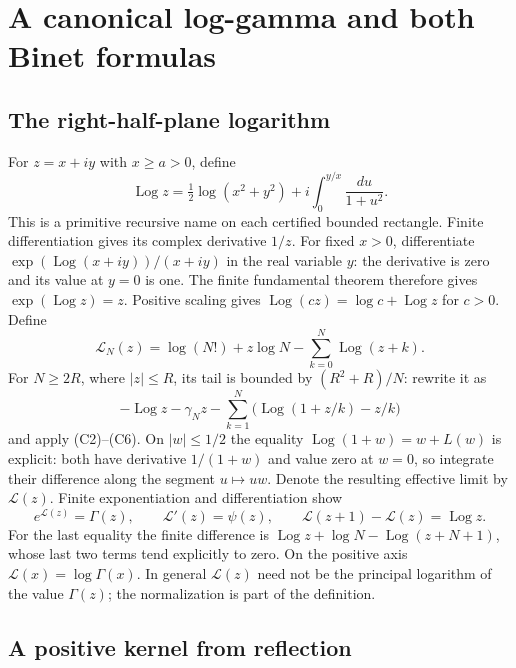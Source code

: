 \section{A canonical log-gamma and both Binet formulas}
\label{sec:binet}

\subsection{The right-half-plane logarithm}

For $z=x+iy$ with $x\ge a>0$, define
\[
 \operatorname{Log}z
 =\tfrac12\log(x^2+y^2)
    +i\int_0^{y/x}\frac{du}{1+u^2}.
\]
This is a primitive recursive name on each certified bounded rectangle.
Finite differentiation gives its complex derivative $1/z$.
For fixed $x>0$, differentiate
$\exp(\operatorname{Log}(x+iy))/(x+iy)$ in the real variable $y$:
the derivative is zero and its value at $y=0$ is one. The finite
fundamental theorem therefore gives $\exp(\operatorname{Log}z)=z$.
Positive scaling gives
$\operatorname{Log}(cz)=\log c+\operatorname{Log}z$ for $c>0$.
Define
\[
 \mathcal L_N(z)=\log(N!)+z\log N-
                        \sum_{k=0}^N\operatorname{Log}(z+k).
\]
For $N\ge2R$, where $|z|\le R$, its tail is bounded by
$(R^2+R)/N$: rewrite it as
\[
 -\operatorname{Log}z-\gamma_Nz
 -\sum_{k=1}^N\bigl(\operatorname{Log}(1+z/k)-z/k\bigr)
\]
and apply (C2)--(C6). On $|w|\le1/2$ the equality
$\operatorname{Log}(1+w)=w+L(w)$ is explicit: both have derivative
$1/(1+w)$ and value zero at $w=0$, so integrate their difference
along the segment $u\mapsto uw$. Denote the resulting effective limit by
$\mathcal L(z)$. Finite exponentiation and differentiation show
\begin{equation}
 e^{\mathcal L(z)}=\Gamma(z),\qquad
 \mathcal L'(z)=\psi(z),\qquad
 \mathcal L(z+1)-\mathcal L(z)=\operatorname{Log}z.
 \label{eq:canonical-loggamma}
\end{equation}
For the last equality the finite difference is
$\operatorname{Log}z+\log N-\operatorname{Log}(z+N+1)$,
whose last two terms tend explicitly to zero. On the positive axis
$\mathcal L(x)=\log\Gamma(x)$. In general $\mathcal L(z)$ need not be
the principal logarithm of the value $\Gamma(z)$; the normalization is
part of the definition.

\subsection{A positive kernel from reflection}

